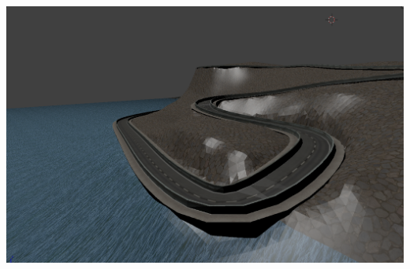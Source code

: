 \documentclass[notes,slidesec,a4]{seminar}
\begin{document}
\begin{hslide}
\begin{minipage}{0.5\textwidth}
	\end{minipage}
	\begin{minipage}{0.51\textwidth}
		\includegraphics[width=\textwidth]{MonacoElev04.png}
	\end{minipage}
\end{hslide}
\end{document}
